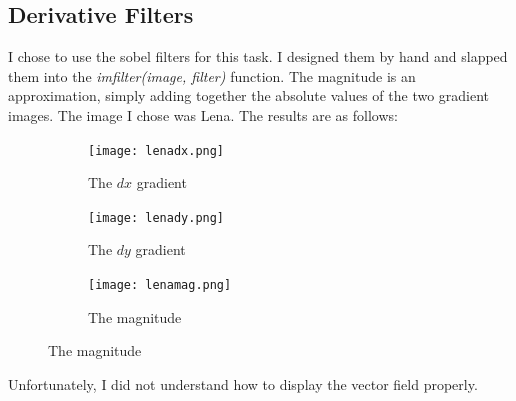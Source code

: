 \documentclass{article}
\begin{document}
\newpage
\subsection{Derivative Filters}
I chose to use the sobel filters for this task. I designed them by hand and slapped them into the \emph{imfilter(image, filter)} function.
The magnitude is an approximation, simply adding together the absolute values of the two gradient images. The image I chose was Lena.
The results are as follows:\\

\begin{figure}[h]
	\centering
	\begin{subfigure}[t]{0.49\textwidth}
		\texttt{[image: lenadx.png]}
		\caption{The $dx$ gradient}
		\label{fig:lenadx.png}
	\end{subfigure}
	\begin{subfigure}[t]{0.49\textwidth}
		\texttt{[image: lenady.png]}
		\caption{The $dy$ gradient}
		\label{fig:lenady.png}
	\end{subfigure}
	\begin{subfigure}[b]{0.49\textwidth}
		\texttt{[image: lenamag.png]}
		\caption{The magnitude}
		\label{fig:lenamag.png}
	\end{subfigure}
\end{figure}

Unfortunately, I did not understand how to display the vector field properly.
\end{document}
